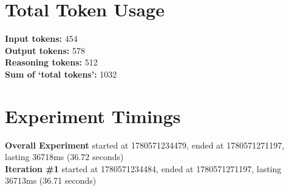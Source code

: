 \documentclass{article}
\begin{document}
\section*{Total Token Usage}
\textbf{Input tokens: }454
\\\textbf{Output tokens: }578
\\\textbf{Reasoning tokens: }512
\\\textbf{Sum of `total tokens': }1032
\section*{Experiment Timings}
\textbf{Overall Experiment} started at 1780571234479, ended at 1780571271197, lasting 36718ms (36.72 seconds)
\\\textbf{Iteration \#1} started at 1780571234484, ended at 1780571271197, lasting 36713ms (36.71 seconds)
\end{document}

